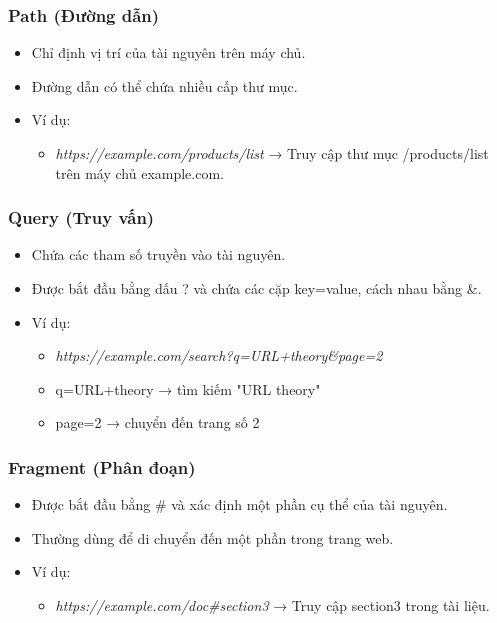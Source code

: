 \documentclass[13pt]{article}
\begin{document}
\subsubsection{Path (Đường dẫn)}
    \begin{itemize}
        \item Chỉ định vị trí của tài nguyên trên máy chủ.
        \item Đường dẫn có thể chứa nhiều cấp thư mục.
        \item Ví dụ: 
        \begin{itemize}
            \item \textit{https://example.com/products/list} → Truy cập thư mục /products/list trên máy chủ example.com.
        \end{itemize}
    \end{itemize}

\subsubsection{Query (Truy vấn)}
    \begin{itemize}
        \item Chứa các tham số truyền vào tài nguyên.
        \item Được bắt đầu bằng dấu ? và chứa các cặp key=value, cách nhau bằng &.
        \item Ví dụ:
        \begin{itemize}
            \item \textit{https://example.com/search?q=URL+theory&page=2}
            \item q=URL+theory → tìm kiếm "URL theory"
            \item page=2 → chuyển đến trang số 2
        \end{itemize}
    \end{itemize}

\subsubsection{Fragment (Phân đoạn)}
    \begin{itemize}
        \item Được bắt đầu bằng # và xác định một phần cụ thể của tài nguyên.
        \item Thường dùng để di chuyển đến một phần trong trang web.
        \item Ví dụ: 
        \begin{itemize}
            \item \textit{https://example.com/doc#section3} → Truy cập section3 trong tài liệu.
        \end{itemize}
    \end{itemize}
\end{document}
